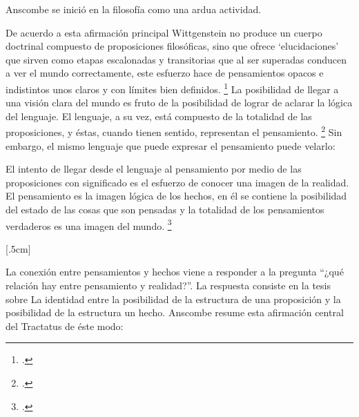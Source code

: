

Anscombe se inició en la filosofía como una ardua actividad.

De acuerdo a esta afirmación principal Wittgenstein no produce un cuerpo
doctrinal compuesto de proposiciones filosóficas, sino que ofrece
`elucidaciones' que sirven como etapas escalonadas y transitorias que al ser
superadas conducen a ver el mundo correctamente, este esfuerzo hace de
pensamientos opacos e indistintos unos claros y con límites bien definidos.
\footcite[cf. 4.112 y 6.54]{tractatus} La posibilidad de llegar a una visión
clara del mundo es fruto de la posibilidad de lograr de aclarar la lógica del
lenguaje. El lenguaje, a su vez, está compuesto de la totalidad de las
proposiciones, y éstas, cuando tienen sentido, representan el pensamiento.
\footcite[cf. 4 y 4.001]{tractatus} Sin embargo, el mismo lenguaje que puede
expresar el pensamiento puede velarlo:



El intento de llegar desde el lenguaje al pensamiento por medio de las
proposiciones con significado es el esfuerzo de conocer una imagen de la
realidad. El pensamiento es la imagen lógica de los hechos, en él se contiene la
posibilidad del estado de las cosas que son pensadas y la totalidad de los
pensamientos verdaderos es una imagen del mundo. \footcite[cf. 3 y
3.001]{tractatus}


[.5cm]

La conexión entre pensamientos y hechos viene a responder a la pregunta ``¿qué
relación hay entre pensamiento y realidad?''. La respuesta consiste en la tesis
sobre La identidad entre la posibilidad de la estructura de una proposición y la
posibilidad de la estructura un hecho. Anscombe resume esta afirmación central
del Tractatus de éste modo:

